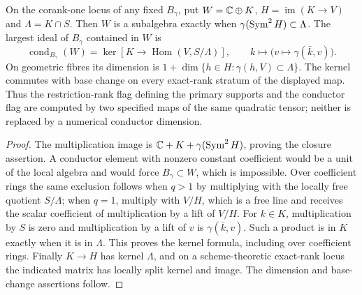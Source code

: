 \begin{proposition}
\label{prop:universal-conductor-flag}
On the corank-one locus of any fixed $B_\gamma$, put
$W=\mathbb C\oplus K$, $H=\operatorname{im}(K\to V)$ and
$\Lambda=K\cap S$. Then $W$ is a subalgebra exactly when
$\gamma(\operatorname{Sym}^2H)\subset\Lambda$. The largest ideal of $B_\gamma$
contained in $W$ is
\begin{equation}\label{eq:general-corank-one-conductor}
 \operatorname{cond}_{B_\gamma}(W)
   =\ker\left[K\longrightarrow\operatorname{Hom}(V,S/\Lambda)\right],
 \qquad k\longmapsto\bigl(v\mapsto\gamma(\bar k,v)\bigr).
\end{equation}
On geometric fibres its dimension is
$1+\dim\{h\in H:\gamma(h,V)\subset\Lambda\}$.
The kernel commutes with base change on every exact-rank stratum
of the displayed map. Thus the restriction-rank flag defining the
primary supports and the conductor flag are computed by two specified
maps of the same quadratic tensor; neither is replaced by a numerical
conductor dimension.
\end{proposition}
\begin{proof}
The multiplication image is $\mathbb C+K+\gamma(\operatorname{Sym}^2H)$, proving
the closure assertion. A conductor element with nonzero constant
coefficient would be a unit of the local algebra and would force
$B_\gamma\subset W$, which is impossible. Over coefficient rings
the same exclusion follows when $q>1$ by multiplying with the
locally free quotient $S/\Lambda$; when $q=1$, multiply with $V/H$,
which is a free line and receives the scalar coefficient of
multiplication by a lift of $V/H$. For $k\in K$, multiplication
by $S$ is zero and multiplication by a lift of $v$ is
$\gamma(\bar k,v)$. Such a product is in $K$ exactly when it is
in $\Lambda$. This proves the kernel formula, including over
coefficient rings. Finally $K\to H$ has kernel $\Lambda$, and
on a scheme-theoretic exact-rank locus the indicated matrix has
locally split kernel and image. The dimension and base-change
assertions follow.
\end{proof}
